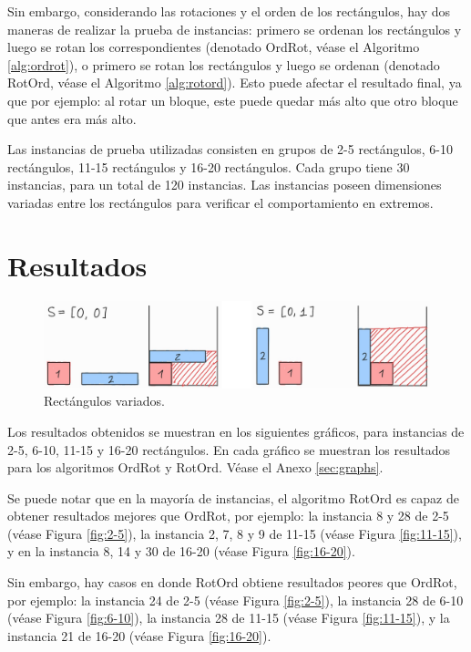 \documentclass[letter, 10pt]{article}
\begin{document}
Sin embargo, considerando las rotaciones y el orden de los rectángulos, hay dos maneras de realizar la prueba de instancias: primero se ordenan los rectángulos y luego se rotan los correspondientes (denotado OrdRot, véase el Algoritmo \ref{alg:ordrot}), o primero se rotan los rectángulos y luego se ordenan (denotado RotOrd, véase el Algoritmo \ref{alg:rotord}). Esto puede afectar el resultado final, ya que por ejemplo: al rotar un bloque, este puede quedar más alto que otro bloque que antes era más alto.

Las instancias de prueba utilizadas consisten en grupos de 2-5 rectángulos, 6-10 rectángulos, 11-15 rectángulos y 16-20 rectángulos. Cada grupo tiene 30 instancias, para un total de 120 instancias. Las instancias poseen dimensiones variadas entre los rectángulos para verificar el comportamiento en extremos.







\section{Resultados}

\begin{figure}[b]
    \centering
    \includegraphics[width=\textwidth]{./img/diffs.jpg}
    \caption{Rectángulos variados.}
    \label{fig:diffs}
\end{figure}

Los resultados obtenidos se muestran en los siguientes gráficos, para instancias de 2-5, 6-10, 11-15 y 16-20 rectángulos. En cada gráfico se muestran los resultados para los algoritmos OrdRot y RotOrd. Véase el Anexo \ref{sec:graphs}.

Se puede notar que en la mayoría de instancias, el algoritmo RotOrd es capaz de obtener resultados mejores que OrdRot, por ejemplo: la instancia 8 y 28 de 2-5 (véase Figura \ref{fig:2-5}), la instancia 2, 7, 8 y 9 de 11-15 (véase Figura \ref{fig:11-15}), y en la instancia 8, 14 y 30 de 16-20 (véase Figura \ref{fig:16-20}).

Sin embargo, hay casos en donde RotOrd obtiene resultados peores que OrdRot, por ejemplo: la instancia 24 de 2-5 (véase Figura \ref{fig:2-5}), la instancia 28 de 6-10 (véase Figura \ref{fig:6-10}), la instancia 28 de 11-15 (véase Figura \ref{fig:11-15}), y la instancia 21 de 16-20 (véase Figura \ref{fig:16-20}).
\end{document}
